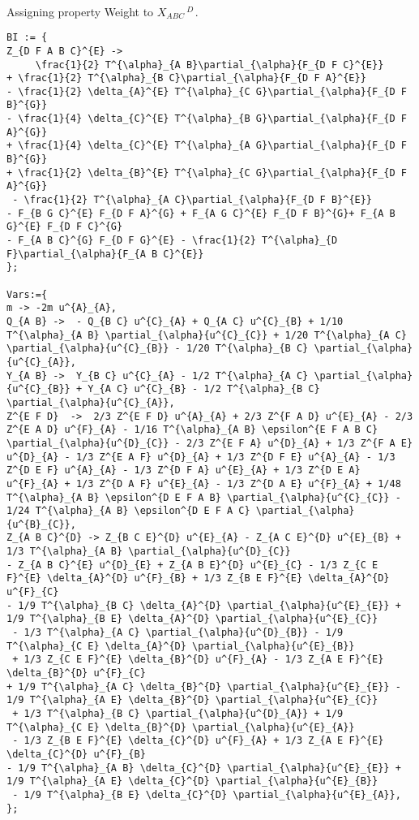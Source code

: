 \documentclass[11pt]{article}
\begin{document}
\\
Assigning property Weight to ${X}_{A B C}\,^{D\, }$.
\\
{\color[named]{Blue}\begin{verbatim}
BI := {
Z_{D F A B C}^{E} -> 
     \frac{1}{2} T^{\alpha}_{A B}\partial_{\alpha}{F_{D F C}^{E}} 
+ \frac{1}{2} T^{\alpha}_{B C}\partial_{\alpha}{F_{D F A}^{E}} 
- \frac{1}{2} \delta_{A}^{E} T^{\alpha}_{C G}\partial_{\alpha}{F_{D F B}^{G}}
- \frac{1}{4} \delta_{C}^{E} T^{\alpha}_{B G}\partial_{\alpha}{F_{D F A}^{G}} 
+ \frac{1}{4} \delta_{C}^{E} T^{\alpha}_{A G}\partial_{\alpha}{F_{D F B}^{G}} 
+ \frac{1}{2} \delta_{B}^{E} T^{\alpha}_{C G}\partial_{\alpha}{F_{D F A}^{G}} 
 - \frac{1}{2} T^{\alpha}_{A C}\partial_{\alpha}{F_{D F B}^{E}} 
- F_{B G C}^{E} F_{D F A}^{G} + F_{A G C}^{E} F_{D F B}^{G}+ F_{A B G}^{E} F_{D F C}^{G} 
- F_{A B C}^{G} F_{D F G}^{E} - \frac{1}{2} T^{\alpha}_{D F}\partial_{\alpha}{F_{A B C}^{E}}
};

Vars:={
m -> -2m u^{A}_{A},
Q_{A B} ->  - Q_{B C} u^{C}_{A} + Q_{A C} u^{C}_{B} + 1/10 T^{\alpha}_{A B} \partial_{\alpha}{u^{C}_{C}} + 1/20 T^{\alpha}_{A C} \partial_{\alpha}{u^{C}_{B}} - 1/20 T^{\alpha}_{B C} \partial_{\alpha}{u^{C}_{A}},
Y_{A B} ->  Y_{B C} u^{C}_{A} - 1/2 T^{\alpha}_{A C} \partial_{\alpha}{u^{C}_{B}} + Y_{A C} u^{C}_{B} - 1/2 T^{\alpha}_{B C} \partial_{\alpha}{u^{C}_{A}},
Z^{E F D}  ->  2/3 Z^{E F D} u^{A}_{A} + 2/3 Z^{F A D} u^{E}_{A} - 2/3 Z^{E A D} u^{F}_{A} - 1/16 T^{\alpha}_{A B} \epsilon^{E F A B C} \partial_{\alpha}{u^{D}_{C}} - 2/3 Z^{E F A} u^{D}_{A} + 1/3 Z^{F A E} u^{D}_{A} - 1/3 Z^{E A F} u^{D}_{A} + 1/3 Z^{D F E} u^{A}_{A} - 1/3 Z^{D E F} u^{A}_{A} - 1/3 Z^{D F A} u^{E}_{A} + 1/3 Z^{D E A} u^{F}_{A} + 1/3 Z^{D A F} u^{E}_{A} - 1/3 Z^{D A E} u^{F}_{A} + 1/48 T^{\alpha}_{A B} \epsilon^{D E F A B} \partial_{\alpha}{u^{C}_{C}} - 1/24 T^{\alpha}_{A B} \epsilon^{D E F A C} \partial_{\alpha}{u^{B}_{C}},
Z_{A B C}^{D} -> Z_{B C E}^{D} u^{E}_{A} - Z_{A C E}^{D} u^{E}_{B} + 1/3 T^{\alpha}_{A B} \partial_{\alpha}{u^{D}_{C}} 
- Z_{A B C}^{E} u^{D}_{E} + Z_{A B E}^{D} u^{E}_{C} - 1/3 Z_{C E F}^{E} \delta_{A}^{D} u^{F}_{B} + 1/3 Z_{B E F}^{E} \delta_{A}^{D} u^{F}_{C} 
- 1/9 T^{\alpha}_{B C} \delta_{A}^{D} \partial_{\alpha}{u^{E}_{E}} + 1/9 T^{\alpha}_{B E} \delta_{A}^{D} \partial_{\alpha}{u^{E}_{C}}
 - 1/3 T^{\alpha}_{A C} \partial_{\alpha}{u^{D}_{B}} - 1/9 T^{\alpha}_{C E} \delta_{A}^{D} \partial_{\alpha}{u^{E}_{B}}
 + 1/3 Z_{C E F}^{E} \delta_{B}^{D} u^{F}_{A} - 1/3 Z_{A E F}^{E} \delta_{B}^{D} u^{F}_{C} 
+ 1/9 T^{\alpha}_{A C} \delta_{B}^{D} \partial_{\alpha}{u^{E}_{E}} - 1/9 T^{\alpha}_{A E} \delta_{B}^{D} \partial_{\alpha}{u^{E}_{C}}
 + 1/3 T^{\alpha}_{B C} \partial_{\alpha}{u^{D}_{A}} + 1/9 T^{\alpha}_{C E} \delta_{B}^{D} \partial_{\alpha}{u^{E}_{A}}
 - 1/3 Z_{B E F}^{E} \delta_{C}^{D} u^{F}_{A} + 1/3 Z_{A E F}^{E} \delta_{C}^{D} u^{F}_{B} 
- 1/9 T^{\alpha}_{A B} \delta_{C}^{D} \partial_{\alpha}{u^{E}_{E}} + 1/9 T^{\alpha}_{A E} \delta_{C}^{D} \partial_{\alpha}{u^{E}_{B}}
 - 1/9 T^{\alpha}_{B E} \delta_{C}^{D} \partial_{\alpha}{u^{E}_{A}},
};


\end{verbatim}}
\end{document}
